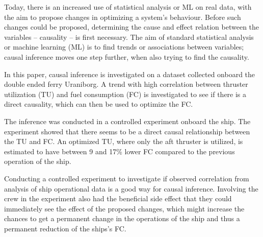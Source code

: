 Today, there is an increased use of statistical analysis or ML on real data, with the aim to propose changes in optimizing a system's behaviour. Before such changes could be proposed, determining the cause and effect relation between the variables -- causality -- is first necessary.
The aim of standard statistical analysis or machine learning (ML) is to find trends or associations between variables; causal inference moves one step further, when also trying to find the causality.

In this paper, causal inference is investigated on a dataset collected onboard the double ended ferry Uraniborg.
A trend with high correlation between thruster utilization (TU) and fuel consumption (FC) is investigated to see if there is a direct causality, which can then be used to optimize the FC.

The inference was conducted in a controlled experiment onboard the ship.
The experiment showed that there seems to be a direct causal relationship between the TU and FC.
An optimized TU, where only the aft thruster is utilized, is estimated to have between 9 and 17\% lower FC compared to the previous operation of the ship.

Conducting a controlled experiment to investigate if observed correlation from analysis of ship operational data is a good way for causal inference. Involving the crew in the experiment also had the beneficial side effect that they could immediately see the effect of the proposed changes, which might increase the chances to get a permanent change in the operations of the ship and thus a permanent reduction of the ships's FC. 





